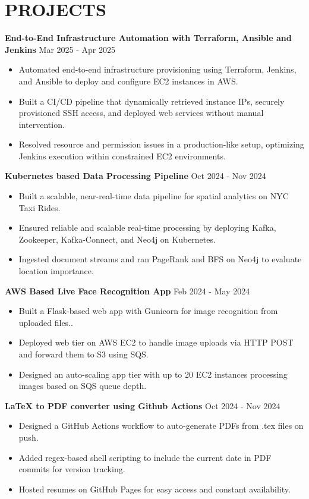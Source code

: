\documentclass[a4paper,9pt]{extarticle}
\begin{document}
\section*{PROJECTS}

\textbf{End-to-End Infrastructure Automation with Terraform, Ansible and Jenkins} \hfill Mar 2025 - Apr 2025%
\begin{itemize}
    \item Automated end-to-end infrastructure provisioning using Terraform, Jenkins, and Ansible to deploy and configure EC2 instances in AWS.
    \item Built a CI/CD pipeline that dynamically retrieved instance IPs, securely provisioned SSH access, and deployed web services without manual intervention.
    \item Resolved resource and permission issues in a production-like setup, optimizing Jenkins execution within constrained EC2 environments.
\end{itemize}

\noindent
\textbf{Kubernetes based Data Processing Pipeline}  \hfill Oct 2024 - Nov 2024%
\begin{itemize}
    \item Built a scalable, near-real-time data pipeline for spatial analytics on NYC Taxi Rides.
    \item Ensured reliable and scalable real-time processing by deploying Kafka, Zookeeper, Kafka-Connect, and Neo4j on Kubernetes.
    \item Ingested document streams and ran PageRank and BFS on Neo4j to evaluate location importance.
    
\end{itemize}

\noindent
\textbf{AWS Based Live Face Recognition App}  \hfill Feb 2024 - May 2024 %
\begin{itemize}
    \item Built a Flask-based web app with Gunicorn for image recognition from uploaded files..
    \item Deployed web tier on AWS EC2 to handle image uploads via HTTP POST and forward them to S3 using SQS.
    \item Designed an auto-scaling app tier with up to 20 EC2 instances processing images based on SQS queue depth.

    
\end{itemize}

\noindent
\textbf{LaTeX to PDF converter using Github Actions} \hfill Oct 2024 - Nov 2024%
\begin{itemize}
    \item Designed a GitHub Actions workflow to auto-generate PDFs from .tex files on push.
    \item Added regex-based shell scripting to include the current date in PDF commits for version tracking.
    \item Hosted resumes on GitHub Pages for easy access and constant availability.
\end{itemize}

\end{document}
